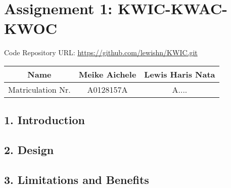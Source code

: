\documentclass[12pt,a4paper]{report}
\begin{document}
\chapter*{Assignement 1: KWIC-KWAC-KWOC}

Code Repository URL: \url{https://github.com/lewishn/KWIC.git} 

\begin{center}
\begin{tabular}{|c|c|c|}
\hline 
Name & Meike Aichele & Lewis Haris Nata\\ 
\hline 
Matriculation Nr. & A0128157A & A.... \\ 
\hline 
\end{tabular} 
\end{center}

\section*{1. Introduction}

\section*{2. Design}

\section*{3. Limitations and Benefits}
\end{document}
